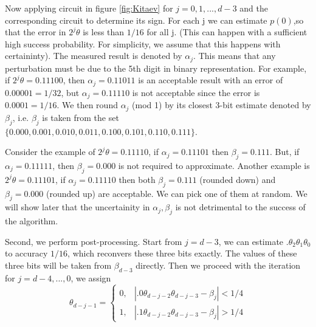 \documentclass[12pt, oneside]{book}
\theoremstyle{definition}
\theoremstyle{definition}
\theoremstyle{remark}
\begin{document}
Now applying circuit in figure \ref{fig:Kitaev} for $j=0,1,...,d-3$ and the corresponding circuit to determine its sign.
For each j we can estimate $p(0)$,so that the error in $2^j\theta$ is less than $1/16$ for all j.
(This can happen with a sufficient high success probability. For simplicity, we assume that this happens with certaininty).
The measured result is denoted by $\alpha_j$. This means that any perturbation must be due
to the 5th digit in binary representation. For example, if $2^j\theta=0.11100$, then $\alpha_j=0.11011$
is an acceptable result with an error of $0.00001=1/32$, but $\alpha_j=0.11110$ is not acceptable
since the error is $0.0001=1/16$. We then round $\alpha_j$ (mod 1) by its closest 3-bit estimate denoted by $\beta_j$, i.e. $\beta_j$ is taken from the
set $\{0.000,0.001,0.010,0.011,0.100,0.101,0.110,0.111\}$.

Consider the example of $2^j\theta=0.11110$, if $\alpha_j=0.11101$ then $\beta_j=0.111$. But,
if $\alpha_j=0.11111$, then $\beta_j=0.000$ is not required to approximate. Another example is $2^j\theta=0.11101$, if $\alpha_j=0.11110$ then both 
$\beta_j=0.111$ (rounded down) and $\beta_j=0.000$ (rounded up) are acceptable. We can pick one of them at random. 
We will show later that the uncertainity in $\alpha_j,\beta_j$ is not detrimental to the success of the algorithm.

Second, we perform post-processing. Start from $j=d-3$, we can estimate $.\theta_2\theta_1\theta_0$
to accuracy $1/16$, which reconvers these three bits exactly. The values of these three bits will be taken from $\beta_{d-3}$ directly.
Then we proceed with the iteration for $j=d-4,...,0$, we assign
\[\theta_{d-j-1}=\begin{cases} 0, & |.0\theta_{d-j-2}\theta_{d-j-3}-\beta_j|<1/4 \\
    1, &|.1\theta_{d-j-2}\theta_{d-j-3}-\beta_j|>1/4 \end{cases}
\]
\end{document}

